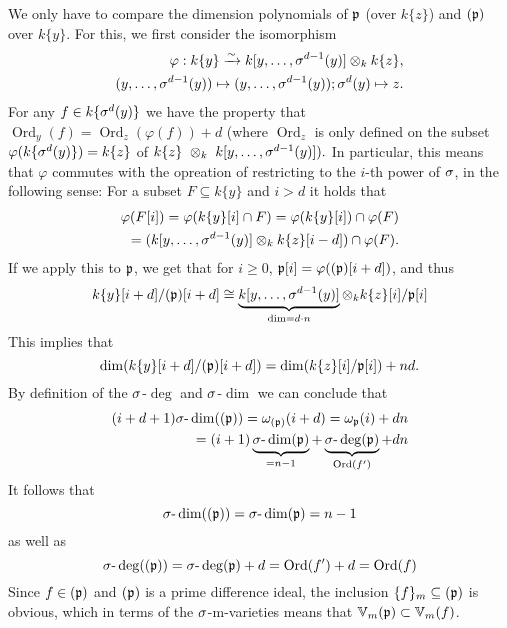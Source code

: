 \begin{cor}
\begin{bew}
We only have to compare the dimension polynomials of $\mathfrak{p}$ (over $k\{z\}$) and $(\mathfrak{p})$ over $k\{y\}$.
For this, we first consider the isomorphism
\begin{align*} \varphi: k\{y\} \xrightarrow{\sim} k[y,\ldots,\sigma^{d-1}(y)] \otimes_k k\{z\}, \\ (y,\ldots,\sigma^{d-1}(y)) \mapsto (y,\ldots,\sigma^{d-1}(y)); \sigma^d(y) \mapsto z. \end{align*}
For any $f \in k\{\sigma^{d}(y)\}$ we have the property that $\operatorname{Ord}_y(f) = \operatorname{Ord}_z(\varphi(f)) + d$ (where $\operatorname{Ord}_z$ is only defined on the subset $\varphi(k\{\sigma^d(y)\}) = k\{z\}$ of $k\{z\}~\otimes_k~k[y,\ldots,\sigma^{d-1}(y)]).$
In particular, this means that $\varphi$ commutes with the opreation of restricting to the $i$-th power of $\sigma$, in the following sense:
For a subset $F \subseteq k\{y\}$ and $i > d$ it holds that
\begin{align*} \varphi(F[i]) = \varphi(k\{y\}[i] \cap F) = \varphi(k\{y\}[i]) \cap \varphi(F) \\
 = (k[y,\ldots,\sigma^{d-1}(y)] \otimes_k k\{z\}[i-d]) \cap \varphi(F) .\end{align*}
If we apply this to $\mathfrak{p}$, we get that for $i\geq 0$, $\mathfrak{p}[i] = \varphi((\mathfrak{p})[i+d])$, and thus 
$$ k\{y\}[i+d]/(\mathfrak{p})[i+d] \cong \underbrace{k[y,\ldots,\sigma^{d-1}(y)]}_{ \text{dim} = d \cdot n} \otimes_k k\{z\}[i]/\mathfrak{p}[i]$$
This implies that 
$$\operatorname{dim}(k\{y\}[i+d]/(\mathfrak{p})[i+d]) = \operatorname{dim}(k\{z\}[i]/\mathfrak{p}[i]) + nd.$$
By definition of the $\sigma$-$\operatorname{deg}$ and $\sigma$-$\operatorname{dim}$ we can conclude that 
\begin{align*}
(i+d+1) \sigma\text{-}\operatorname{dim}( (\mathfrak{p}) ) = \omega_{(\mathfrak{p})}(i+d) = \omega_{\mathfrak{p}}(i) + dn \\
= (i+1) \underbrace{\sigma\text{-}\operatorname{dim}(\mathfrak{p})}_{ = n - 1} + \underbrace{\sigma\text{-}\operatorname{deg}(\mathfrak{p})}_{\operatorname{Ord}(f')} + dn
\end{align*}
It follows that 
$$\sigma\text{-}\operatorname{dim}((\mathfrak{p}))= \sigma\text{-}\operatorname{dim}(\mathfrak{p}) = n-1 $$
as well as
$$\sigma\text{-}\operatorname{deg}((\mathfrak{p}))= \sigma\text{-}\operatorname{deg}(\mathfrak{p}) + d = \operatorname{Ord}(f') + d = \operatorname{Ord}(f)$$
Since $f \in (\mathfrak{p})$ and $(\mathfrak{p})$ is a prime difference ideal, the inclusion $\{f\}_m \subseteq (\mathfrak{p})$ is obvious, which in terms of the $\sigma$-m-varieties means that $\mathbb{V}_m(\mathfrak{p}) \subset \mathbb{V}_m(f)$. 

\end{bew}
\end{cor}

